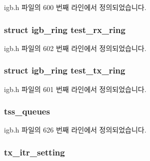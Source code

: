 igb.\+h 파일의 600 번째 라인에서 정의되었습니다.

\subsubsection[{\texorpdfstring{test\+\_\+rx\+\_\+ring}{test_rx_ring}}]{\setlength{\rightskip}{0pt plus 5cm}struct {\bf igb\+\_\+ring} test\+\_\+rx\+\_\+ring}\hypertarget{structigb__adapter_a0c0089b2b72b329e955bfa3d6a4d50d5}{}\label{structigb__adapter_a0c0089b2b72b329e955bfa3d6a4d50d5}


igb.\+h 파일의 602 번째 라인에서 정의되었습니다.

\subsubsection[{\texorpdfstring{test\+\_\+tx\+\_\+ring}{test_tx_ring}}]{\setlength{\rightskip}{0pt plus 5cm}struct {\bf igb\+\_\+ring} test\+\_\+tx\+\_\+ring}\hypertarget{structigb__adapter_ad24385913394e01aa32e20adaa04c3cd}{}\label{structigb__adapter_ad24385913394e01aa32e20adaa04c3cd}


igb.\+h 파일의 601 번째 라인에서 정의되었습니다.

\subsubsection[{\texorpdfstring{tss\+\_\+queues}{tss_queues}}]{ tss\+\_\+queues}\hypertarget{structigb__adapter_ac371dbd0d19f7dbef43358d84575729d}{}\label{structigb__adapter_ac371dbd0d19f7dbef43358d84575729d}


igb.\+h 파일의 626 번째 라인에서 정의되었습니다.

\subsubsection[{\texorpdfstring{tx\+\_\+itr\+\_\+setting}{tx_itr_setting}}]{ tx\+\_\+itr\+\_\+setting}\hypertarget{structigb__adapter_a656e1ed19f6d6550e41ef4f8c7522663}{}\label{structigb__adapter_a656e1ed19f6d6550e41ef4f8c7522663}



